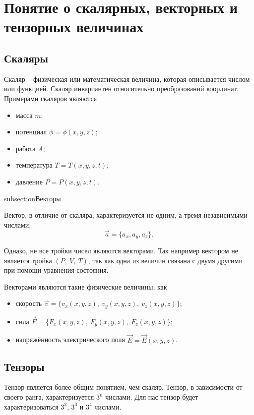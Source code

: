 \section{Понятие о скалярных, векторных и тензорных величинах}

\subsection{Скаляры}

    Скаляр -- физическая или математическая величина, которая описывается числом или функцией. Скаляр инвариантен относительно преобразований координат. Примерами скаляров являются
    \begin{itemize}
        \item масса \( m \); 
        \item потенциал \( \phi = \phi(x, y, z) \);
        \item работа \( A \);
        \item температура \( T = T(x, y, z, t) \);
        \item давление \( P = P(x, y, z, t) \).
    \end{itemize}

subsection{Векторы}

    Вектор, в отличие от скаляра, характеризуется не одним, а тремя независимыми числами:
    \[ \vec{a} = \{ a_{x}, a_{y}, a_{z} \}. \]

    Однако, не все тройки чисел являются векторами. Так например вектором не является тройка \( (P,\ V,\ T) \), так как одна из величин связана с двумя другими при помощи уравнения состояния.
    
    Векторами являются такие физические величины, как
    \begin{itemize}
        \item скорость \( \vec{v} = \{v_x(x, y, z),\ v_y(x, y, z),\ v_z(x, y, z)\} \);
        \item сила \( \vec{F} = \{F_x(x, y, z),\ F_y(x, y, z),\ F_z(x, y, z)\} \);
        \item напряжённость электрического поля \( \vec{E} = \vec{E}(x, y, z) \).
    \end{itemize}

\subsection{Тензоры}

    Тензор является более общим понятием, чем скаляр. Тензор, в зависимости от своего ранга, характеризуется \( 3^n \) числами. Для нас тензор будет характеризоваться \( 3^2 \), \( 3^3 \) и \( 3^4 \) числами.
    
